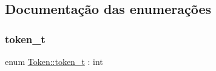 \subsection{Documentação das enumerações}
\mbox{\label{structToken_a0c0bd3a78407f44bc1fd21a9da6bd85b}} 
\subsubsection{\texorpdfstring{token\+\_\+t}{token\_t}}
{\footnotesize\ttfamily enum \hyperlink{structToken_a0c0bd3a78407f44bc1fd21a9da6bd85b}{Token\+::token\+\_\+t} \+: int\hspace{0.3cm}{\ttfamily [strong]}}

